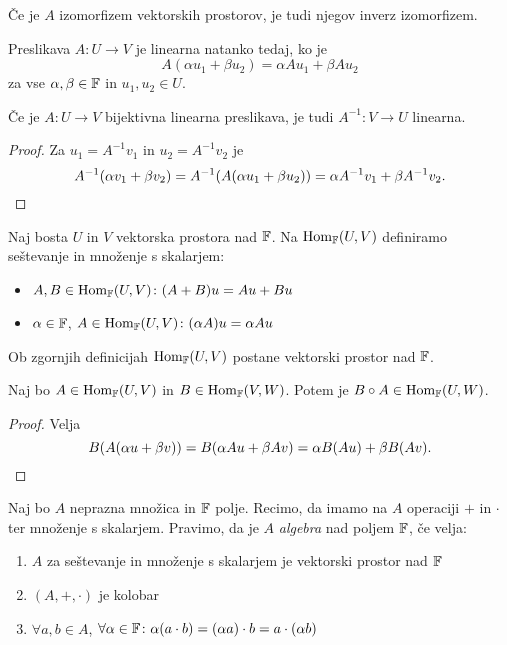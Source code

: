 \documentclass[12pt, a4paper]{article}
\begin{document}
\begin{opomba}
Če je $A$ izomorfizem vektorskih prostorov, je tudi njegov inverz izomorfizem.
\end{opomba}

\begin{trditev}
Preslikava $A\colon U\to V$ je linearna natanko tedaj, ko je
\[
A(\alpha u_1+\beta u_2)=\alpha Au_1+\beta Au_2
\]
za vse $\alpha,\beta\in\mathbb{F}$ in $u_1,u_2\in U$.
\end{trditev}

\obvs

\begin{trditev}
Če je $A\colon U\to V$ bijektivna linearna preslikava, je tudi $A^{-1}\colon V\to U$ linearna.
\end{trditev}

\begin{proof}
Za $u_1=A^{-1}v_1$ in $u_2=A^{-1}v_2$ je
\[
A^{-1}(\alpha v_1+\beta v_2)=A^{-1}(A(\alpha u_1+\beta u_2))=\alpha A^{-1}v_1+\beta A^{-1}v_2.\qedhere
\]
\end{proof}

\begin{definicija}
Naj bosta $U$ in $V$ vektorska prostora nad $\mathbb{F}$. Na $\operatorname{Hom}_{\mathbb{F}}(U,V)$ definiramo seštevanje in množenje s skalarjem:

\begin{itemize}
\item $A,B\in\operatorname{Hom}_{\mathbb{F}}(U,V)\colon (A+B)u=Au+Bu$
\item $\alpha\in\mathbb{F}$, $A\in\operatorname{Hom}_{\mathbb{F}}(U,V)\colon (\alpha A)u=\alpha Au$
\end{itemize}
\end{definicija}

\begin{trditev}
Ob zgornjih definicijah $\operatorname{Hom}_{\mathbb{F}}(U,V)$ postane vektorski prostor nad $\mathbb{F}$.
\end{trditev}

\obvs

\begin{trditev}\label{td:komp}
Naj bo $A\in\operatorname{Hom}_{\mathbb{F}}(U,V)$ in $B\in\operatorname{Hom}_{\mathbb{F}}(V,W)$. Potem je $B\circ A\in\operatorname{Hom}_{\mathbb{F}}(U,W)$.
\end{trditev}

\begin{proof}
Velja
\[
B(A(\alpha u+\beta v))=B(\alpha Au+\beta Av)=\alpha B(Au)+\beta B(Av).\qedhere
\]
\end{proof}

\begin{definicija}
Naj bo $A$ neprazna množica in $\mathbb{F}$ polje. Recimo, da imamo na $A$ operaciji $+$ in $\cdot$ ter množenje s skalarjem. Pravimo, da je $A$ \emph{algebra} nad poljem $\mathbb{F}$, če velja:

\begin{enumerate}[label=\arabic*)]
\item $A$ za seštevanje in množenje s skalarjem je vektorski prostor nad $\mathbb{F}$
\item $(A,+,\cdot)$ je kolobar
\item $\forall a,b\in A$, $\forall\alpha\in\mathbb{F}\colon \alpha(a\cdot b)=(\alpha a)\cdot b=a\cdot(\alpha b)$
\end{enumerate}
\end{definicija}
\end{document}
